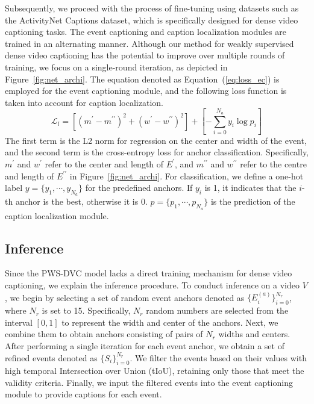 Subsequently, we proceed with the process of fine-tuning using datasets such as the ActivityNet Captions dataset, which is specifically designed for dense video captioning tasks.
The event captioning and caption localization modules are trained in an alternating manner.
Although our method for weakly supervised dense video captioning has the potential to improve over multiple rounds of training, we focus on a single-round iteration, as depicted in Figure~\ref{fig:net_archi}.
The equation denoted as Equation~(\ref{eq:loss_ec}) is employed for the event captioning module, and the following loss function is taken into account for caption localization.
\begin{equation}
    \mathcal{L}_l=\left[ \left( m^{\prime} - m^{\prime \prime}\right)^2 + \left( w^{\prime} - w^{\prime \prime} \right)^2 \right] + \left[ -\sum_{i=0}^{N_a} y_i \log p_i \right]
    \label{eq:loss_cl}
\end{equation}
The first term is the L2 norm for regression on the center and width of the event, and the second term is the cross-entropy loss for anchor classification.
Specifically, $m^{\prime}$ and $w^{\prime}$ refer to the center and length of $E^{\prime}$, and $m^{\prime \prime}$ and $w^{\prime \prime}$ refer to the centre and length of $E^{\prime \prime}$ in Figure~\ref{fig:net_archi}.
For classification, we define a one-hot label $y = \{y_1, \cdots, y_{N_a} \}$ for the predefined anchors.
If $y_i$ is 1, it indicates that the $i$-th anchor is the best, otherwise it is 0.
$p = \{p_1, \cdots, p_{N_a} \}$ is the prediction of the caption localization module.


\subsection{Inference}
Since the PWS-DVC model lacks a direct training mechanism for dense video captioning, we explain the inference procedure.
To conduct inference on a video $V$, we begin by selecting a set of random event anchors denoted as $\{E_i^{(a)}\}_{i=0}^{N_r}$, where $N_r$ is set to 15.
Specifically, $N_r$ random numbers are selected from the interval $[0, 1]$ to represent the width and center of the anchors.
Next, we combine them to obtain anchors consisting of pairs of $N_r$ widths and centers.
After performing a single iteration for each event anchor, we obtain a set of refined events denoted as $\{S_i\}_{i=0}^{N_r}$.
We filter the events based on their values with high temporal Intersection over Union (tIoU), retaining only those that meet the validity criteria.
Finally, we input the filtered events into the event captioning module to provide captions for each event.


